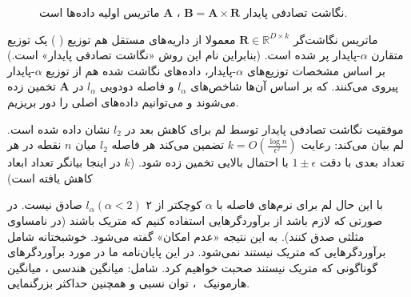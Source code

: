 \begin{figure}[h]
\centering
\begin{latin}
\end{latin}
\caption{
نگاشت تصادفی پایدار 
$\mathbf{B} = \mathbf{A} \times \mathbf{R}$
،
$\mathbf{A}$
ماتریس اولیه داده‌ها است.
}
\label{fig:matrixmulti}
\end{figure}

ماتریس نگاشت‌گر 
$\mathbf{R} \in \mathbb{R}^{D \times k}$
معمولا از داریه‌های مستقل هم توزیع (
) یک توزیع متقارن $\alpha$-پایدار پر شده است.
\cite{litez171}
(بنابراین نام این روش «نگاشت تصادفی پایدار» است.)
بر اساس مشخصات توزیع‌های $\alpha$-پایدار، داده‌های نگاشت شده هم از توزیع $\alpha$-پایدار پیروی می‌کنند. که بر اساس آن‌ها شاخص‌های $l_\alpha$ و فاصله دودویی $l_\alpha$ در $\mathbf{A}$ تخمین زده می‌شوند و می‌توانیم داده‌های اصلی را دور بریزیم.

موفقیت نگاشت تصادفی پایدار توسط لم 
%
%
\cite{litez103}
برای کاهش بعد در $l_2$ نشان داده شده است. لم
بیان می‌کند: رعایت
$k = O \left ( \frac{\log n}{\epsilon^2 } \right ) $
تضمین می‌کند هر فاصله $l_2$ میان $n$ نقطه در هر تعداد بعدی با دقت 
$1\pm\epsilon$
 با احتمال بالایی تخمین زده شود. ($k$ در اینجا بیانگر تعداد ابعاد کاهش یافته است)

با این حال لم 
برای نرم‌های فاصله با 
$\alpha$
کوچکتر از ۲ 
$l_\alpha ( \alpha < 2 )$
صادق نیست. در صورتی که لازم باشد از برآوردگرهایی استفاده کنیم که متریک باشند (در نامساوی مثلثی صدق کنند). به این نتیجه «عدم امکان»%
 گفته می‌شود.
\cite{litez39, litez109, litez33}
خوشبختانه شامل برآوردگرهایی که متریک نیستند نمی‌شود. در این پایان‌نامه ما در مورد برآوردگرهای گوناگونی که متریک نیستند صحبت خواهیم کرد. شامل: میانگین هندسی%
، میانگین هارمونیک%
‌
، توان نسبی%
و همچنین حداکثر بزرگنمایی.

